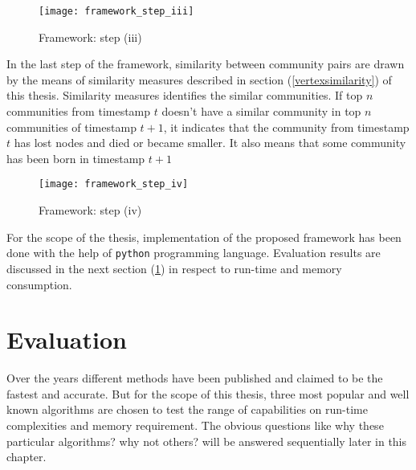 \begin{figure}[H]
	\centering
	\texttt{[image: framework\_step\_iii]}
	\caption{Framework: step (iii)}
	\label{fig:community}
\end{figure}

In the last step of the framework, similarity between community pairs are drawn by the means of similarity measures described in section (\ref{vertexsimilarity}) of this thesis. Similarity measures identifies the similar communities. If top $n$ communities from timestamp $t$ doesn't have a similar community in top $n$ communities of timestamp $t+1$, it indicates that the community from timestamp $t$ has lost nodes and died or became smaller. It also means that some community has been born in timestamp $t+1$

\begin{figure}[H]
	\centering
	\texttt{[image: framework\_step\_iv]}
	\caption{Framework: step (iv)}
	\label{fig:community}
\end{figure}

For the scope of the thesis, implementation of the proposed framework has been done with the help of \texttt{python} programming language. Evaluation results are discussed in the next section (\ref{sec:evaluation}) in respect to run-time and memory consumption.

\section{Evaluation}\label{sec:evaluation}
Over the years different methods have been published and claimed to be the fastest and accurate. But for the scope of this thesis, three most popular and well known algorithms are chosen to test the range of capabilities on run-time complexities and memory requirement. The obvious questions like why these particular algorithms? why not others? will be answered sequentially later in this chapter.

